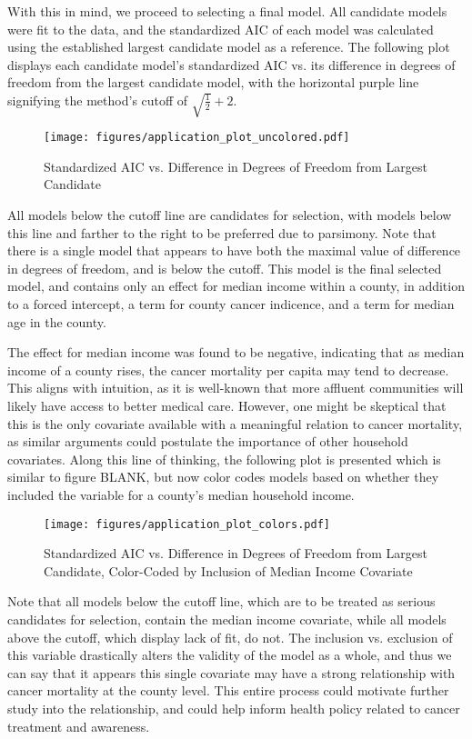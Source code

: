 		With this in mind, we proceed to selecting a final model. All candidate models were fit to the data, and the standardized AIC of each model was calculated
		using the established largest candidate model as a reference. The following plot displays each candidate model's standardized AIC vs. its difference in
		degrees of freedom from the largest candidate model, with the horizontal purple line signifying the method's cutoff of $\sqrt{\frac{1}{2}} + 2$.

		\begin{figure}[H]
			\centering
			\captionsetup{justification=centering}
			\texttt{[image: figures/application\_plot\_uncolored.pdf]}
			\caption{\label{fig:app_stand_AIC_plot_no_colors} Standardized AIC vs. Difference in Degrees of Freedom from Largest Candidate}
		\end{figure}

		All models below the cutoff line are candidates for selection, with models below this line and farther to the right to be preferred due to parsimony. Note
		that there is a single model that appears to have both the maximal value of difference in degrees of freedom, and is below the cutoff. This model is the
		final selected model, and contains only an effect for median income within a county, in addition to a forced intercept, a term for county cancer indicence,
		and a term for median age in the county.
		
		The effect for median income was found to be negative, indicating that as median income of a county rises, the cancer mortality per capita may tend to
		decrease. This aligns with intuition, as it is well-known that more affluent communities will likely have access to better medical care. However, one
		might be skeptical that this is the only covariate available with a meaningful relation to cancer mortality, as similar arguments could postulate
		the importance of other household covariates. Along this line of thinking, the following plot is presented which is similar to figure BLANK, but now
		color codes models based on whether they included the variable for a county's median household income.

		\begin{figure}[H]
			\centering
			\captionsetup{justification=centering}
			\texttt{[image: figures/application\_plot\_colors.pdf]}
			\caption{\label{fig:app_stand_AIC_plot_colors} Standardized AIC vs. Difference in Degrees of Freedom from Largest Candidate,
			Color-Coded by Inclusion of Median Income Covariate}
		\end{figure}

		Note that all models below the cutoff line, which are to be treated as serious candidates for selection, contain the median income covariate, while all models
		above the cutoff, which display lack of fit, do not. The inclusion vs. exclusion of this variable drastically alters the validity of the model as a whole, and
		thus we can say that it appears this single covariate may have a strong relationship with cancer mortality at the county level. This entire process could
		motivate further study into the relationship, and could help inform health policy related to cancer treatment and awareness.

